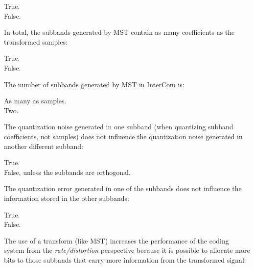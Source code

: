 \documentclass[legalpaper, 12pt, addpoints]{exam}
\begin{document}
\begin{questions}
\begin{oneparchoices}
  \choice True.\\
  \choice False.
\end{oneparchoices}
  
\vspace{0.10in}

\question In total, the subbands generated by MST contain as many coefficients as the transformed samples:

\begin{oneparchoices}
  \choice True.\\
  \choice False.
\end{oneparchoices}
  
\vspace{0.10in}

\question The number of subbands generated by MST in InterCom is:

\begin{oneparchoices}
  \choice As many as samples.\\
  \choice Two.
\end{oneparchoices}
  
\vspace{0.10in}

\question The quantization noise generated in one subband (when quantizing subband coefficients, not samples) does not influence the quantization noise generated in another different subband:

\begin{oneparchoices}
  \choice True.\\
  \choice False, unless the subbands are orthogonal.
\end{oneparchoices}
  
\vspace{0.10in}

\question The quantization error generated in one of the subbands does not influence the information stored in the other subbands:

\begin{oneparchoices}
  \choice True.\\
  \choice False.
\end{oneparchoices}
  
\vspace{0.10in}

\question The use of a transform (like MST) increases the performance of the coding system from the \emph{rate/distortion} perspective because it is possible to allocate more bits to those subbands that carry more information from the transformed signal:


\end{questions}
\end{document}
